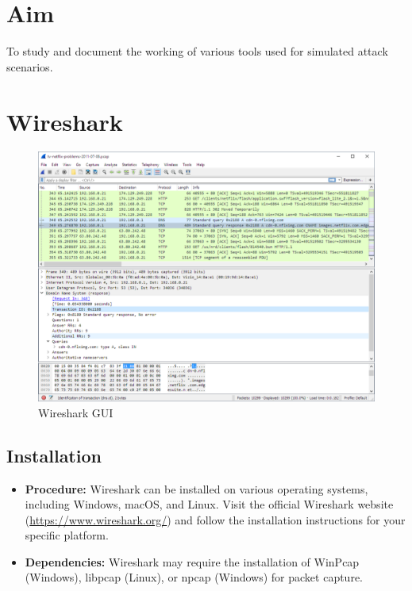 \documentclass[11pt]{article}
\begin{document}
\tableofcontents
\thispagestyle{empty}
\clearpage

\setcounter{page}{1}

\section{Aim}
To study and document the working of various tools used for simulated attack scenarios.

\section{Wireshark}

\begin{figure}[H]
	\centering
	\includegraphics[width=.95\textwidth]{img/wireshark/wireshark_0.jpg}
	\caption{Wireshark GUI}
\end{figure}

\subsection{Installation}
\begin{itemize}
	\item \textbf{Procedure:} Wireshark can be installed on various operating systems, including Windows, macOS, and Linux. Visit the official Wireshark website (\url{https://www.wireshark.org/}) and follow the installation instructions for your specific platform.
	\item \textbf{Dependencies:} Wireshark may require the installation of WinPcap (Windows), libpcap (Linux), or npcap (Windows) for packet capture.
\end{itemize}
\end{document}
